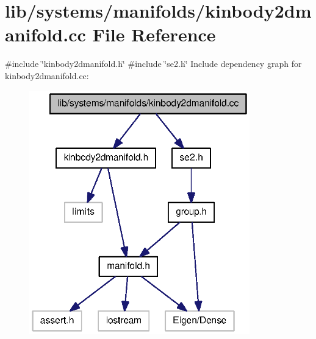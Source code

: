 \section{lib/systems/manifolds/kinbody2dmanifold.cc \-File \-Reference}
\label{kinbody2dmanifold_8cc}
{\ttfamily \#include \char`\"{}kinbody2dmanifold.\-h\char`\"{}}\*
{\ttfamily \#include \char`\"{}se2.\-h\char`\"{}}\*
\-Include dependency graph for kinbody2dmanifold.\-cc\-:
\nopagebreak
\begin{figure}[H]
\begin{center}
\leavevmode
\includegraphics[width=271pt]{kinbody2dmanifold_8cc__incl}
\end{center}
\end{figure}
